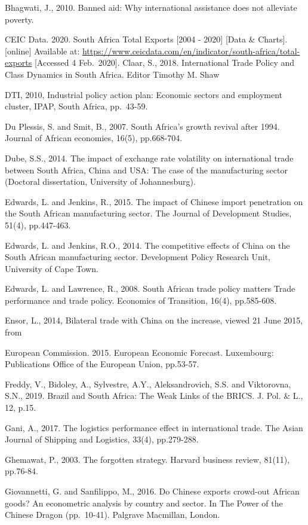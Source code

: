 \documentclass[11pt,preprint, authoryear]{elsarticle}
\numberwithin{equation}{section}
\numberwithin{figure}{section}
\numberwithin{table}{section}
\begin{document}
Bhagwati, J., 2010. Banned aid: Why international assistance does not
alleviate poverty.

CEIC Data. 2020. South Africa Total Exports {[}2004 - 2020{]} {[}Data \&
Charts{]}. {[}online{]} Available at:
\url{https://www.ceicdata.com/en/indicator/south-africa/total-exports}
{[}Accessed 4 Feb.~2020{]}. Claar, S., 2018. International Trade Policy
and Class Dynamics in South Africa. Editor Timothy M. Shaw

DTI, 2010, Industrial policy action plan: Economic sectors and
employment cluster, IPAP, South Africa, pp.~43-59.

Du Plessis, S. and Smit, B., 2007. South Africa's growth revival after
1994. Journal of African economies, 16(5), pp.668-704.

Dube, S.S., 2014. The impact of exchange rate volatility on
international trade between South Africa, China and USA: The case of the
manufacturing sector (Doctoral dissertation, University of
Johannesburg).

Edwards, L. and Jenkins, R., 2015. The impact of Chinese import
penetration on the South African manufacturing sector. The Journal of
Development Studies, 51(4), pp.447-463.

Edwards, L. and Jenkins, R.O., 2014. The competitive effects of China on
the South African manufacturing sector. Development Policy Research
Unit, University of Cape Town.

Edwards, L. and Lawrence, R., 2008. South African trade policy matters
Trade performance and trade policy. Economics of Transition, 16(4),
pp.585-608.

Ensor, L., 2014, Bilateral trade with China on the increase, viewed 21
June 2015, from

European Commission. 2015. European Economic Forecast. Luxembourg:
Publications Office of the European Union, pp.53-57.

Freddy, V., Bidoley, A., Sylvestre, A.Y., Aleksandrovich, S.S. and
Viktorovna, S.N., 2019. Brazil and South Africa: The Weak Links of the
BRICS. J. Pol. \& L., 12, p.15.

Gani, A., 2017. The logistics performance effect in international trade.
The Asian Journal of Shipping and Logistics, 33(4), pp.279-288.

Ghemawat, P., 2003. The forgotten strategy. Harvard business review,
81(11), pp.76-84.

Giovannetti, G. and Sanfilippo, M., 2016. Do Chinese exports crowd-out
African goods? An econometric analysis by country and sector. In The
Power of the Chinese Dragon (pp.~10-41). Palgrave Macmillan, London.
\end{document}

